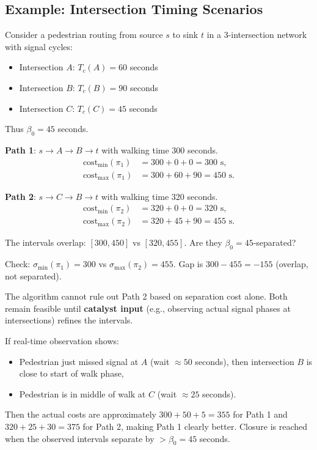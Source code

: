 \documentclass[twocolumn,11pt,a4paper]{article}
\theoremstyle{definition}
\begin{document}
\subsection{Example: Intersection Timing Scenarios}

Consider a pedestrian routing from source $s$ to sink $t$ in a 3-intersection network with signal cycles:
\begin{itemize}
\item Intersection $A$: $T_c(A) = 60$ seconds
\item Intersection $B$: $T_c(B) = 90$ seconds
\item Intersection $C$: $T_c(C) = 45$ seconds
\end{itemize}

Thus $\beta_0 = 45$ seconds.

\textbf{Path 1}: $s \to A \to B \to t$ with walking time 300 seconds.
\begin{align}
\text{cost}_{\min}(\pi_1) &= 300 + 0 + 0 = 300 \text{ s}, \\
\text{cost}_{\max}(\pi_1) &= 300 + 60 + 90 = 450 \text{ s}.
\end{align}

\textbf{Path 2}: $s \to C \to B \to t$ with walking time 320 seconds.
\begin{align}
\text{cost}_{\min}(\pi_2) &= 320 + 0 + 0 = 320 \text{ s}, \\
\text{cost}_{\max}(\pi_2) &= 320 + 45 + 90 = 455 \text{ s}.
\end{align}

The intervals overlap: $[300, 450]$ vs $[320, 455]$. Are they $\beta_0 = 45$-separated?

Check: $\sigma_{\min}(\pi_1) = 300$ vs $\sigma_{\max}(\pi_2) = 455$. Gap is $300 - 455 = -155$ (overlap, not separated).

The algorithm cannot rule out Path 2 based on separation cost alone. Both remain feasible until \textbf{catalyst input} (e.g., observing actual signal phases at intersections) refines the intervals.

If real-time observation shows:
\begin{itemize}
\item Pedestrian just missed signal at $A$ (wait $\approx 50$ seconds), then intersection $B$ is close to start of walk phase,
\item Pedestrian is in middle of walk at $C$ (wait $\approx 25$ seconds).
\end{itemize}

Then the actual costs are approximately $300 + 50 + 5 = 355$ for Path 1 and $320 + 25 + 30 = 375$ for Path 2, making Path 1 clearly better. Closure is reached when the observed intervals separate by $>\beta_0 = 45$ seconds.
\end{document}
